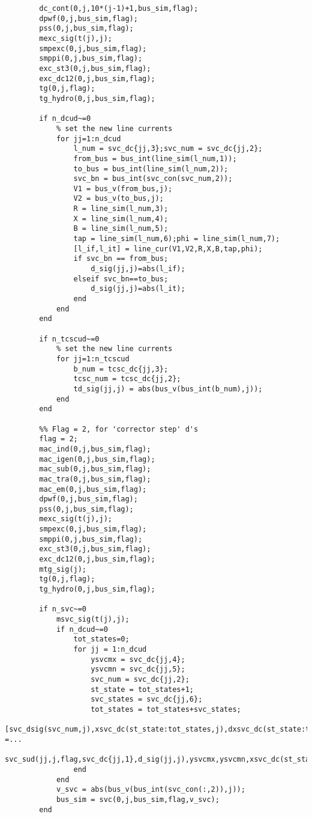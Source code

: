 \documentclass[12pt]{article}
\begin{document}
\begin{verbatim}
        dc_cont(0,j,10*(j-1)+1,bus_sim,flag);
        dpwf(0,j,bus_sim,flag);
        pss(0,j,bus_sim,flag);
        mexc_sig(t(j),j);
        smpexc(0,j,bus_sim,flag);
        smppi(0,j,bus_sim,flag);
        exc_st3(0,j,bus_sim,flag);
        exc_dc12(0,j,bus_sim,flag);
        tg(0,j,flag);
        tg_hydro(0,j,bus_sim,flag);
        
        if n_dcud~=0
            % set the new line currents
            for jj=1:n_dcud
                l_num = svc_dc{jj,3};svc_num = svc_dc{jj,2};
                from_bus = bus_int(line_sim(l_num,1)); 
                to_bus = bus_int(line_sim(l_num,2));
                svc_bn = bus_int(svc_con(svc_num,2));
                V1 = bus_v(from_bus,j);
                V2 = bus_v(to_bus,j);
                R = line_sim(l_num,3);
                X = line_sim(l_num,4);
                B = line_sim(l_num,5);
                tap = line_sim(l_num,6);phi = line_sim(l_num,7);
                [l_if,l_it] = line_cur(V1,V2,R,X,B,tap,phi);
                if svc_bn == from_bus;
                    d_sig(jj,j)=abs(l_if);
                elseif svc_bn==to_bus;
                    d_sig(jj,j)=abs(l_it);
                end
            end
        end
        
        if n_tcscud~=0
            % set the new line currents
            for jj=1:n_tcscud
                b_num = tcsc_dc{jj,3};
                tcsc_num = tcsc_dc{jj,2};
                td_sig(jj,j) = abs(bus_v(bus_int(b_num),j));
            end
        end
        
        %% Flag = 2, for 'corrector step' d's
        flag = 2;
        mac_ind(0,j,bus_sim,flag);
        mac_igen(0,j,bus_sim,flag);
        mac_sub(0,j,bus_sim,flag);
        mac_tra(0,j,bus_sim,flag);
        mac_em(0,j,bus_sim,flag);
        dpwf(0,j,bus_sim,flag);
        pss(0,j,bus_sim,flag);
        mexc_sig(t(j),j);
        smpexc(0,j,bus_sim,flag);
        smppi(0,j,bus_sim,flag);
        exc_st3(0,j,bus_sim,flag);
        exc_dc12(0,j,bus_sim,flag);
        mtg_sig(j);
        tg(0,j,flag);
        tg_hydro(0,j,bus_sim,flag);
        
        if n_svc~=0
            msvc_sig(t(j),j);
            if n_dcud~=0
                tot_states=0;
                for jj = 1:n_dcud
                    ysvcmx = svc_dc{jj,4};
                    ysvcmn = svc_dc{jj,5};
                    svc_num = svc_dc{jj,2};
                    st_state = tot_states+1; 
                    svc_states = svc_dc{jj,6}; 
                    tot_states = tot_states+svc_states;
                    [svc_dsig(svc_num,j),xsvc_dc(st_state:tot_states,j),dxsvc_dc(st_state:tot_states,j)] =...
                        svc_sud(jj,j,flag,svc_dc{jj,1},d_sig(jj,j),ysvcmx,ysvcmn,xsvc_dc(st_state:tot_states,j));
                end
            end
            v_svc = abs(bus_v(bus_int(svc_con(:,2)),j));
            bus_sim = svc(0,j,bus_sim,flag,v_svc);
        end
        

\end{verbatim}
\end{document}
